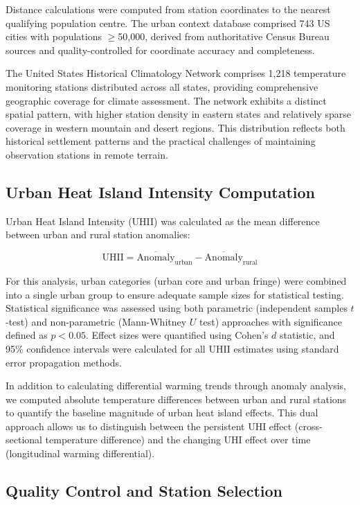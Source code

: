 \documentclass[11pt, a4paper]{article}
\begin{document}
Distance calculations were computed from station coordinates to the nearest qualifying population centre. The urban context database comprised 743 US cities with populations $\geq$50,000, derived from authoritative Census Bureau sources and quality-controlled for coordinate accuracy and completeness.


The United States Historical Climatology Network comprises 1,218 temperature monitoring stations distributed across all states, providing comprehensive geographic coverage for climate assessment. The network exhibits a distinct spatial pattern, with higher station density in eastern states and relatively sparse coverage in western mountain and desert regions. This distribution reflects both historical settlement patterns and the practical challenges of maintaining observation stations in remote terrain.

\subsection{Urban Heat Island Intensity Computation}

Urban Heat Island Intensity (UHII) was calculated as the mean difference between urban and rural station anomalies:

\begin{equation} \text{UHII} = \overline{\text{Anomaly}}_{\text{urban}} - \overline{\text{Anomaly}}_{\text{rural}} \end{equation}

For this analysis, urban categories (urban core and urban fringe) were combined into a single urban group to ensure adequate sample sizes for statistical testing. Statistical significance was assessed using both parametric (independent samples $t$-test) and non-parametric (Mann-Whitney $U$ test) approaches with significance defined as $p < 0.05$. Effect sizes were quantified using Cohen's $d$ statistic, and 95\% confidence intervals were calculated for all UHII estimates using standard error propagation methods.

In addition to calculating differential warming trends through anomaly analysis, we computed absolute temperature differences between urban and rural stations to quantify the baseline magnitude of urban heat island effects. This dual approach allows us to distinguish between the persistent UHI effect (cross-sectional temperature difference) and the changing UHI effect over time (longitudinal warming differential).

  \subsection{Quality Control and Station Selection}
\end{document}

